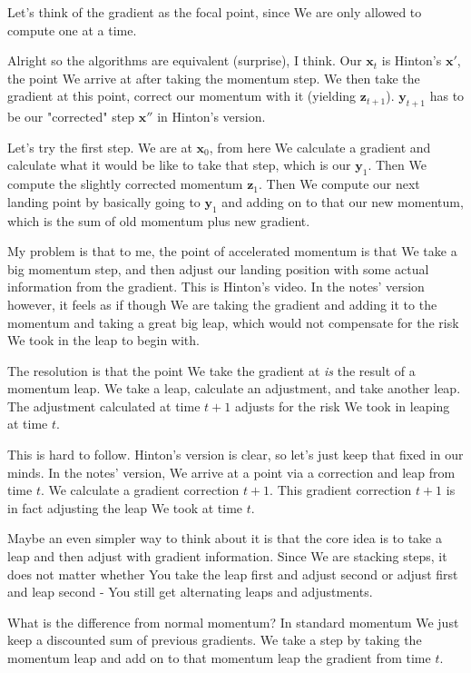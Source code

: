 \documentclass{article}
\begin{document}
		Let's think of the gradient as the focal point, since We are only allowed to compute one at a time. 
		
		Alright so the algorithms are equivalent (surprise), I think. Our $\mathbf{x}_t$ is Hinton's $\mathbf{x'}$, the point We arrive at after taking the momentum step. We then take the gradient at this point, correct our momentum with it (yielding $\mathbf{z}_{t+1}$). $\mathbf{y}_{t+1}$ has to be our "corrected" step $\mathbf{x''}$ in Hinton's version. 
		
		Let's try the first step. We are at $\mathbf{x}_0$, from here We calculate a gradient and calculate what it would be like to take that step, which is our $\mathbf{y}_1$. Then We compute the slightly corrected momentum $\mathbf{z}_1$. Then We compute our next landing point by basically going to $\mathbf{y}_1$ and adding on to that our new momentum, which is the sum of old momentum plus new gradient.
		
		My problem is that to me,  the point of accelerated momentum is that We take a big momentum step, and then adjust our landing position with some actual information from the gradient. This is Hinton's video. In the notes' version however, it feels as if though We are taking the gradient and adding it to the momentum and taking a great big leap, which would not compensate for the risk We took in the leap to begin with.
		
		The resolution is that the point We take the gradient at \textit{is} the result of a momentum leap. We take a leap, calculate an adjustment, and take another leap. The adjustment calculated at time $t+1$ adjusts for the risk We took in leaping at time $t$.
		
		This is hard to follow. Hinton's version is clear, so let's just keep that fixed in our minds. In the notes' version, We arrive at a point via a correction and leap from time $t$. We calculate a gradient correction $t+1$. This gradient correction $t+1$ is in fact adjusting the leap We took at time $t$.
		
		Maybe an even simpler way to think about it is that the core idea is to take a leap and then adjust with gradient information. Since We are stacking steps, it does not matter whether You take the leap first and adjust second or adjust first and leap second - You still get alternating leaps and adjustments. 
		
		What is the difference from normal momentum? In standard momentum We just keep a discounted sum of previous gradients. We take a step by taking the momentum leap and add on to that momentum leap the gradient from time $t$. 
		
\end{document}
